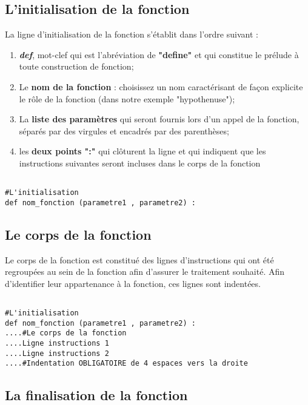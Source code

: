 \subsection{L'initialisation de la fonction}

La ligne d'initialisation de la fonction s'établit dans l'ordre suivant :
\begin{enumerate}
	\item \textbf{\textit{def}}, mot-clef qui est l'abréviation de \textbf{"define"} et qui constitue le prélude à toute construction de fonction;
	\item Le \textbf{nom de la fonction} : choisissez un nom caractérisant de façon explicite le rôle de la fonction (dans notre exemple "hypothenuse");
	\item La \textbf{liste des paramètres} qui seront fournis lors d'un appel de la fonction, séparés par des virgules et encadrés par des parenthèses;
	\item les \textbf{deux points ":"} qui clôturent la ligne et qui indiquent que les instructions suivantes seront incluses dans le corps de la fonction
\end{enumerate}

\begin{lstlisting}[frame=lines]

#L'initialisation
def nom_fonction (parametre1 , parametre2) :
\end{lstlisting}

\subsection{Le corps de la fonction}

Le corps de la fonction est constitué des lignes d'instructions qui ont été regroupées au sein de la fonction afin d'assurer le traitement souhaité.
Afin d'identifier leur appartenance à la fonction, ces lignes sont indentées.
\begin{lstlisting}[frame=lines]

#L'initialisation
def nom_fonction (parametre1 , parametre2) :
....#Le corps de la fonction 
....Ligne instructions 1
....Ligne instructions 2
....#Indentation OBLIGATOIRE de 4 espaces vers la droite
\end{lstlisting}


\subsection{La finalisation de la fonction}

